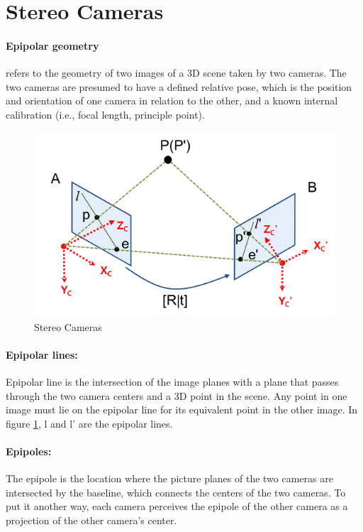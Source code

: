 \documentclass[11pt]{article}
\begin{document}
    \section{Stereo Cameras}
    \label{stereo_cameras}
    \paragraph{Epipolar geometry} refers to the geometry of two images of a 3D scene taken
    by two cameras. The two cameras are presumed to have a defined relative pose, which is
    the position and orientation of one camera in relation to the other, and a known internal calibration
    (i.e., focal length, principle point).

    \begin{figure}
        \centering
        \includegraphics[width=\textwidth,height=\textheight,keepaspectratio]{images/epipolar_1.png}
        \caption{Stereo Cameras}
        \label{fig:stereo_cameras}
    \end{figure}


    \paragraph{Epipolar lines:} Epipolar line is the intersection of the image planes with a plane that
    passes through the two camera centers and a 3D point in the scene. Any point in one image must lie on
    the epipolar line for its equivalent point in the other image. In figure \ref{fig:stereo_cameras}, l and l' are the epipolar lines.

    \paragraph{Epipoles:} The epipole is the location where the picture planes of the two cameras are
    intersected by the baseline, which connects the centers of the two cameras. To put it another way,
    each camera perceives the epipole of the other camera as a projection of the other camera's center.
\end{document}
